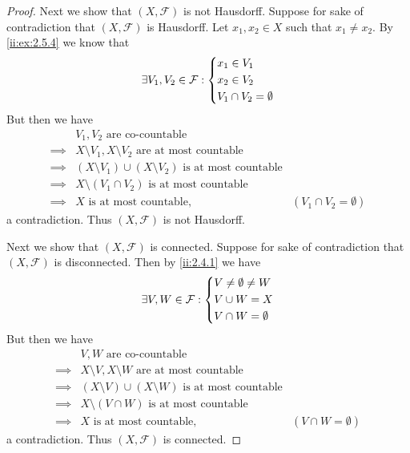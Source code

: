 \begin{proof}
  Next we show that \((X, \mathcal{F})\) is not Hausdorff.
  Suppose for sake of contradiction that \((X, \mathcal{F})\) is Hausdorff.
  Let \(x_1, x_2 \in X\) such that \(x_1 \neq x_2\).
  By \cref{ii:ex:2.5.4} we know that
  \[
    \exists V_1, V_2 \in \mathcal{F} : \begin{dcases}
      x_1 \in V_1 \\
      x_2 \in V_2 \\
      V_1 \cap V_2 = \emptyset
    \end{dcases}
  \]
  But then we have
  \begin{align*}
             & V_1, V_2 \text{ are co-countable}                                                                  \\
    \implies & X \setminus V_1, X \setminus V_2 \text{ are at most countable}                                     \\
    \implies & (X \setminus V_1) \cup (X \setminus V_2) \text{ is at most countable}                              \\
    \implies & X \setminus (V_1 \cap V_2) \text{ is at most countable}                                            \\
    \implies & X \text{ is at most countable},                                       & (V_1 \cap V_2 = \emptyset)
  \end{align*}
  a contradiction.
  Thus \((X, \mathcal{F})\) is not Hausdorff.

  Next we show that \((X, \mathcal{F})\) is connected.
  Suppose for sake of contradiction that \((X, \mathcal{F})\) is disconnected.
  Then by \cref{ii:2.4.1} we have
  \[
    \exists V, W \in \mathcal{F} : \begin{dcases}
      V \neq \emptyset \neq W \\
      V \cup W = X            \\
      V \cap W = \emptyset
    \end{dcases}
  \]
  But then we have
  \begin{align*}
             & V, W \text{ are co-countable}                                                              \\
    \implies & X \setminus V, X \setminus W \text{ are at most countable}                                 \\
    \implies & (X \setminus V) \cup (X \setminus W) \text{ is at most countable}                          \\
    \implies & X \setminus (V \cap W) \text{ is at most countable}                                        \\
    \implies & X \text{ is at most countable},                                   & (V \cap W = \emptyset)
  \end{align*}
  a contradiction.
  Thus \((X, \mathcal{F})\) is connected.


\end{proof}
